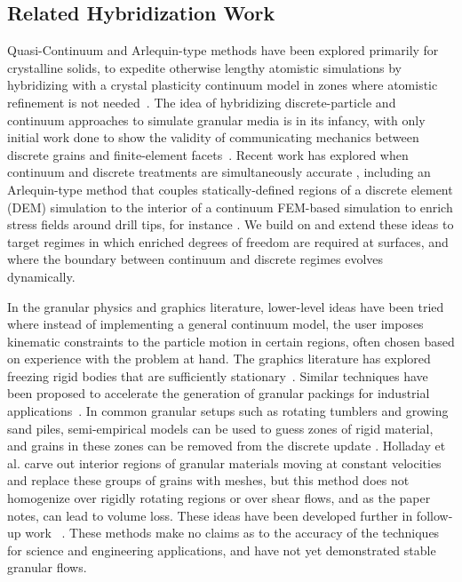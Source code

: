 \subsection{Related Hybridization Work}
Quasi-Continuum and Arlequin-type methods have been
explored primarily for crystalline solids, to expedite otherwise lengthy atomistic simulations by hybridizing with a
crystal plasticity continuum model in zones where atomistic refinement is not
needed~\cite{Tadmor:1996,Smith:2001,Shimokawa:2007,Zhang:2005,Dhia:1998}. The idea of hybridizing discrete-particle and
continuum approaches to simulate granular media is in its infancy, with only initial work done to show the validity of
communicating mechanics between discrete grains and finite-element facets~\cite{Yan:2010}. Recent work has explored when
continuum and discrete treatments are simultaneously accurate \cite{Rycroft:2009,Kamrin:2010,Kamrin:2014}, including an
Arlequin-type method that couples statically-defined regions of a discrete element (DEM) simulation to the interior of a continuum
FEM-based simulation to enrich stress fields around drill tips, for instance \cite{Wellmann:2012}. We build on and extend these ideas to
target regimes in which enriched degrees of freedom are required at surfaces, and where the boundary between continuum
and discrete regimes evolves dynamically.

In the granular physics and graphics literature, lower-level ideas have been tried where instead of implementing a
general continuum model, the user imposes kinematic constraints to the particle motion in certain regions, often chosen
based on experience with the problem at hand. The graphics literature has explored freezing rigid bodies that are
sufficiently stationary~\cite{Smith:2005}. Similar techniques have been proposed to accelerate the generation of
granular packings for industrial applications~\cite{Mio:2009}. In common granular setups such as rotating tumblers and
growing sand piles, semi-empirical models can be used to guess zones of rigid material, and grains in these zones can be
removed from the discrete update \cite{McCarthy:1998,Hsu:2010,Zhu:2010,Bouchaud:1994}. Holladay et al.\cite{Holladay:2012}
carve out interior regions of granular materials moving at constant velocities and replace these groups of grains with
meshes, but this method does not homogenize over rigidly rotating regions or over shear flows, and as the paper notes,
can lead to volume loss. These ideas have been developed further in follow-up work ~\cite{Holladay:2013,Munns:2015}.
These methods make no claims as to the accuracy of the techniques for science and engineering applications, and have not
yet demonstrated stable granular flows.
